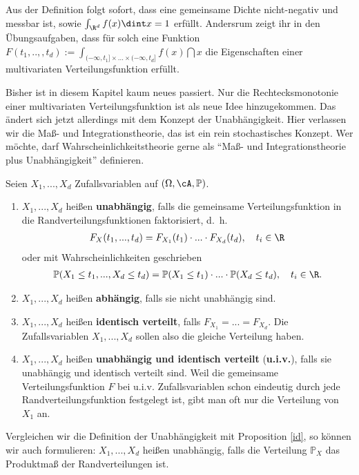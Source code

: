 Aus der Definition folgt sofort, dass eine gemeinsame Dichte nicht-negativ und messbar ist, sowie $\int_{\R^d} f(x)\dint x=1$ erf\"ullt. Andersrum zeigt ihr in den \"Ubungsaufgaben, dass f\"ur solch eine Funktion $F(t_1,..,,t_d):=\int_{(-\infty, t_1]\times ... \times(-\infty, t_d]} f(x)\dint x$ die Eigenschaften einer multivariaten Verteilungsfunktion erf\"ullt.\smallskip

Bisher ist in diesem Kapitel kaum neues passiert. Nur die Rechtecksmonotonie einer multivariaten Verteilungsfunktion ist als neue Idee hinzugekommen. Das \"andert sich jetzt allerdings mit dem Konzept der Unabh\"angigkeit. Hier verlassen wir die Ma\ss - und Integrationstheorie, das ist ein rein stochastisches Konzept. Wer m\"ochte, darf Wahrscheinlichkeitstheorie gerne als \enquote{Ma\ss - und Integrationstheorie plus Unabh\"angigkeit} definieren.
\begin{deff}
	Seien $X_1,...,X_d$ Zufallsvariablen auf $(\Omega, \cA, \mathbb{P})$. 
	\begin{enumerate}[label=(\roman*)]
		\item $X_1,...,X_d$ hei\ss en \textbf{unabhängig}, falls die gemeinsame Verteilungsfunktion in die Randverteilungsfunktionen faktorisiert, \mbox{d. h.}
		\begin{align*}
			F_X(t_1,...,t_d) = F_{X_1}(t_1) \cdot ... \cdot F_{X_d}(t_d), \quad t_i \in \R 
		\end{align*}
		oder mit Wahrscheinlichkeiten geschrieben
		\begin{align*}
			 \mathbb{P}(X_1 \leq t_1,...,X_d \leq t_d) = \mathbb{P}(X_1 \leq t_1) \cdot ... \cdot \mathbb{P}(X_d \leq t_d), \quad t_i \in \R.
		\end{align*}
		\item $X_1,...,X_d$ hei\ss en \textbf{abhängig}, falls sie nicht unabhängig sind.
		\item $X_1,...,X_d$ hei\ss en \textbf{identisch verteilt}, falls  $F_{X_1} = ... = F_{X_d}$. Die Zufallsvariablen $X_1, ..., X_d$ sollen also die gleiche Verteilung haben.
		\item $X_1,...,X_d$ hei\ss en \textbf{unabh\"angig und identisch verteilt} (\textbf{u.i.v.}), falls sie unabh\"angig und identisch verteilt sind. Weil die gemeinsame Verteilungsfunktion $F$ bei u.i.v. Zufallsvariablen schon eindeutig durch jede Randverteilungsfunktion festgelegt ist, gibt man oft nur die Verteilung von $X_1$ an.
	\end{enumerate}
\end{deff}
Vergleichen wir die Definition der Unabh\"angigkeit mit Proposition \ref{id}, so k\"onnen wir auch formulieren: $X_1,...,X_d$ hei\ss en unabh\"angig, falls die Verteilung $\mathbb P_X$ das Produktma\ss{} der Randverteilungen ist.
